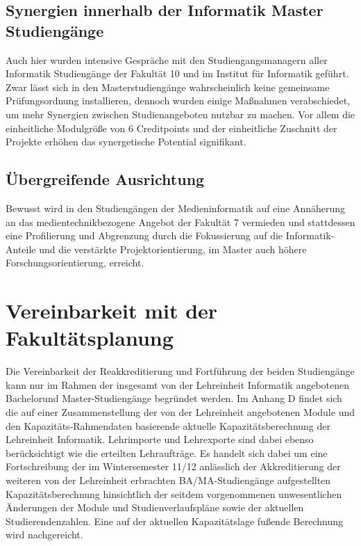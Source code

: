 \section{Synergien innerhalb der Informatik Master
Studiengänge}\label{synergien-innerhalb-der-informatik-master-studienguxe4nge}

Auch hier wurden intensive Gespräche mit den Studiengangsmanagern aller
Informatik Studiengänge der Fakultät 10 und im Institut für Informatik
geführt. Zwar lässt sich in den Masterstudiengänge wahrscheinlich keine
gemeinsame Prüfungsordnung installieren, dennoch wurden einige Maßnahmen
verabschiedet, um mehr Synergien zwischen Studienangeboten nutzbar zu
machen. Vor allem die einheitliche Modulgröße von 6 Creditpoints und der
einheitliche Zuschnitt der Projekte erhöhen das synergetische Potential
signifikant.

\section{Übergreifende
Ausrichtung}\label{uxfcbergreifende-ausrichtung}

Bewusst wird in den Studiengängen der Medieninformatik auf eine
Annäherung an das medientechnikbezogene Angebot der Fakultät 7 vermieden
und stattdessen eine Profilierung und Abgrenzung durch die Fokussierung
auf die Informatik-Anteile und die verstärkte Projektorientierung, im
Master auch höhere Forschungsorientierung, erreicht.

\chapter{Vereinbarkeit mit der
Fakultätsplanung}\label{vereinbarkeit-mit-der-fakultuxe4tsplanung}

Die Vereinbarkeit der Reakkreditierung und Fortführung der beiden
Studiengänge kann nur im Rahmen der insgesamt von der Lehreinheit
Informatik angebotenen Bachelorund Master-Studiengänge begründet werden.
Im Anhang D findet sich die auf einer Zusammenstellung der von der
Lehreinheit angebotenen Module und den Kapazitäts-Rahmendaten basierende
aktuelle Kapazitätsberechnung der Lehreinheit Informatik. Lehrimporte
und Lehrexporte sind dabei ebenso berücksichtigt wie die erteilten
Lehraufträge. Es handelt sich dabei um eine Fortschreibung der im
Wintersemester 11/12 anlässlich der Akkreditierung der weiteren von der
Lehreinheit erbrachten BA/MA-Studiengänge aufgestellten
Kapazitätsberechnung hinsichtlich der seitdem vorgenommenen
unwesentlichen Änderungen der Module und Studienverlaufspläne sowie der
aktuellen Studierendenzahlen. Eine auf der aktuellen Kapazitätslage
fußende Berechnung wird nachgereicht.

